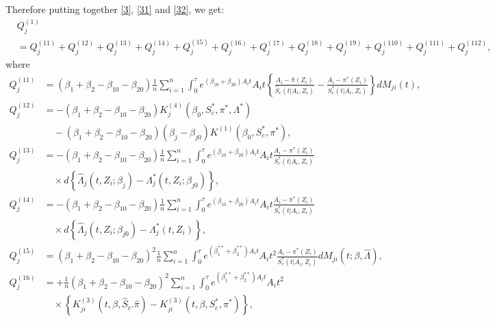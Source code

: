 \documentclass[11pt]{article}
\begin{document}
\begin{newproof7}
Therefore putting together \eqref{3}, \eqref{31} and \eqref{32}, we get:
\begin{align*}
&Q^{(1)}_j\\&=Q^{(11)}_j+Q^{(12)}_j+Q^{(13)}_j+Q^{(14)}_j+Q^{(15)}_j+
Q^{(16)}_j+
Q^{(17)}_j+Q^{(18)}_j+Q^{(19)}_j+Q^{(110)}_j+
Q^{(111)}_j+Q^{(112)}_j,
\end{align*}
where 
\begin{align*}
Q^{(11)}_j&=(\beta_1+\beta_2-\beta_{10}-\beta_{20})\frac{1}{n}\sum_{i=1}^n\int_0^\tau e^{ (\beta_{10}  + \beta_{20})A_i t}A_i t \left\{\frac{A_i -\hat \pi( Z_i)}{\hat S_c(t | A_i,Z_i)}-\frac{A_i -\pi^{*}( Z_i)}{S^{*}_c(t | A_i,Z_i)}\right\}dM_{ji}(t),\nonumber\\
Q^{(12)}_j&=-(\beta_1+\beta_2-\beta_{10}-\beta_{20})K^{(4)}_j(\beta_0, S^{*}_c,\pi^{*}, \Lambda^{*})
\\&\quad-(\beta_1+\beta_2-\beta_{10}-\beta_{20})(\beta_j-\beta_{j0})K^{(1)}(\beta_0,S^{*}_c, \pi^{*}),\\
Q^{(13)}_j&=-(\beta_1+\beta_2-\beta_{10}-\beta_{20})\frac{1}{n}\sum_{i=1}^n\int_0^\tau e^{ (\beta_{10}  + \beta_{20})A_i t}A_i t \frac{A_i -\pi^{*}( Z_i)}{S^{*}_c(t | A_i,Z_i)}
\\&\quad \times d\left\{\hat \Lambda_j(t,Z_i ; \beta_j)- \Lambda^{*}_j(t,Z_i; \beta_{j0})\right\},\nonumber\\
Q^{(14)}_j&=-(\beta_1+\beta_2-\beta_{10}-\beta_{20})\frac{1}{n}\sum_{i=1}^n\int_0^\tau e^{ (\beta_{10}  + \beta_{20})A_i t}A_i t \frac{A_i -\pi^{*}( Z_i)}{S^{*}_c(t | A_i,Z_i)}
\\&\quad \times d\left\{\hat \Lambda_j(t,Z_i ; \beta_{j0})- \Lambda_j^{*}(t,Z_i)\right\},\\
Q^{(15)}_j&=(\beta_1+\beta_2-\beta_{10}-\beta_{20})^2\frac{1}{n}\sum_{i=1}^n\int_0^\tau e^{ (\beta^{**}_1  + \beta^{**}_2)A_i t}A_i t^2 \frac{A_i -\pi^{*}( Z_i)}{S^{*}_c(t | A_i,Z_i)}dM_{ji}(t ; \beta, \hat \Lambda),\\
Q^{(16)}_j&=+\frac{1}{n}(\beta_1+\beta_2-\beta_{10}-\beta_{20})^2\sum_{i=1}^n\int_0^\tau e^{ (\beta^{**}_1  + \beta^{**}_2)A_i t}A_i t^2 \\ & \quad\times\left\{K^{(3)}_{ji}(t, \beta,\hat S_c. \hat \pi)-K^{(3)}_{ji}(t, \beta,S^{*}_c, \pi^{*})\right\},\\

\end{align*}
\end{newproof7}
\end{document}
